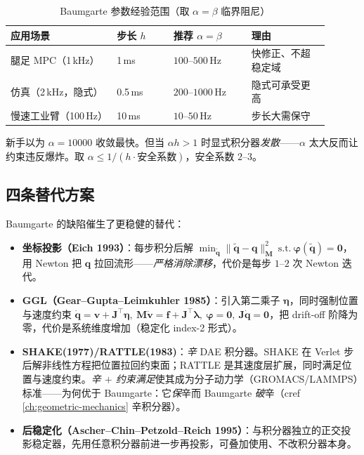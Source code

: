 \begin{table}[H]\centering\small
\caption{Baumgarte 参数经验范围（取 $\alpha=\beta$ 临界阻尼）}
\label{tab:cd-baumgarte}
\begin{tabular}{p{0.30\linewidth}p{0.16\linewidth}p{0.22\linewidth}p{0.22\linewidth}}
\toprule
应用场景 & 步长 $h$ & 推荐 $\alpha=\beta$ & 理由 \\
\midrule
腿足 MPC（1\,kHz） & 1\,ms & $100$–$500$\,Hz & 快修正、不超稳定域 \\
仿真（2\,kHz，隐式） & 0.5\,ms & $200$–$1000$\,Hz & 隐式可承受更高 \\
慢速工业臂（100\,Hz） & 10\,ms & $10$–$50$\,Hz & 步长大需保守 \\
\bottomrule
\end{tabular}
\end{table}

\begin{pitfall}
新手以为 $\alpha=10000$ 收敛最快。但当 $\alpha h>1$ 时显式积分器\emph{发散}——$\alpha$ 太大反而让约束违反爆炸。取 $\alpha\le1/(h\cdot\text{安全系数})$，安全系数 $2$–$3$。
\end{pitfall}

\subsection{四条替代方案}
Baumgarte 的缺陷催生了更稳健的替代：

\begin{itemize}
  \item \textbf{坐标投影（Eich 1993）}：每步积分后解 $\min_{\tilde{\mathbf q}}\|\tilde{\mathbf q}-\mathbf q\|_{\mathbf M}^2\ \text{s.t.}\ \boldsymbol\varphi(\tilde{\mathbf q})=\mathbf 0$，用 Newton 把 $\mathbf q$ 拉回流形——\emph{严格消除漂移}，代价是每步 $1$–$2$ 次 Newton 迭代。
  \item \textbf{GGL（Gear--Gupta--Leimkuhler 1985）}\cite{gear1985automatic}：引入第二乘子 $\boldsymbol\eta$，同时强制位置与速度约束 $\dot{\mathbf q}=\mathbf v+\mathbf J^\top\boldsymbol\eta,\ \mathbf M\dot{\mathbf v}=\mathbf f+\mathbf J^\top\boldsymbol\lambda,\ \boldsymbol\varphi=\mathbf 0,\ \mathbf J\dot{\mathbf q}=\mathbf 0$，把 drift-off 阶降为零，代价是系统维度增加（稳定化 index-2 形式）。
  \item \textbf{SHAKE(1977)/RATTLE(1983)}\cite{ryckaert1977numerical,andersen1983rattle}：\emph{辛} DAE 积分器。SHAKE 在 Verlet 步后解非线性方程把位置拉回约束面；RATTLE 是其速度层扩展，同时满足位置与速度约束。\emph{辛 $+$ 约束满足}使其成为分子动力学（GROMACS/LAMMPS）标准——为何优于 Baumgarte：它\emph{保}辛而 Baumgarte \emph{破}辛（cref \cref{ch:geometric-mechanics} 辛积分器）。
  \item \textbf{后稳定化（Ascher--Chin--Petzold--Reich 1995）}：与积分器独立的正交投影稳定器，先用任意积分器前进一步再投影，可叠加使用、不改积分器本身。
\end{itemize}

